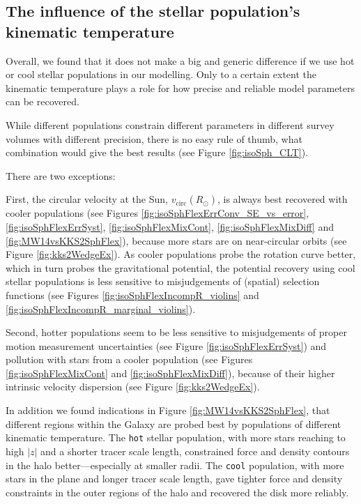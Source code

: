\subsection{The influence of the stellar population's kinematic temperature} \label{sec:results_temperature}

Overall, we found that it does not make a big and generic difference if we use hot or cool stellar populations in our modelling. Only to a certain extent the kinematic temperature plays a role for how precise and reliable model parameters can be recovered. 

While different populations constrain different parameters in different survey volumes with different precision, there is no easy rule of thumb, what combination would give the best results (see Figure \ref{fig:isoSph_CLT}).

There are two exceptions: 

First, the circular velocity at the Sun, $v_\text{circ}(R_\odot)$, is always best recovered with cooler populations (see Figures \ref{fig:isoSphFlexErrConv_SE_vs_error}, \ref{fig:isoSphFlexErrSyst}, \ref{fig:isoSphFlexMixCont}, \ref{fig:isoSphFlexMixDiff} and \ref{fig:MW14vsKKS2SphFlex}), because more stars are on near-circular orbits (see Figure \ref{fig:kks2WedgeEx}). As cooler populations probe the rotation curve better, which in turn probes the gravitational potential, the potential recovery using cool stellar populations is less sensitive to misjudgements of (spatial) selection functions (see Figures \ref{fig:isoSphFlexIncompR_violins} and \ref{fig:isoSphFlexIncompR_marginal_violins}).

Second, hotter populations seem to be less sensitive to misjudgements of proper motion measurement uncertainties (see Figure \ref{fig:isoSphFlexErrSyst}) and pollution with stars from a cooler population (see Figures \ref{fig:isoSphFlexMixCont} and \ref{fig:isoSphFlexMixDiff}), because of their higher intrinsic velocity dispersion (see Figure \ref{fig:kks2WedgeEx}).

In addition we found indications in Figure \ref{fig:MW14vsKKS2SphFlex}, that different regions within the Galaxy are probed best by populations of different kinematic temperature. The \texttt{hot} stellar population, with more stars reaching to high $|z|$ and a shorter tracer scale length, constrained force and density contours in the halo better---especially at smaller radii. The \texttt{cool} population, with more stars in the plane and longer tracer scale length, gave tighter force and density constraints in the outer regions of the halo and recovered the disk more reliably.

